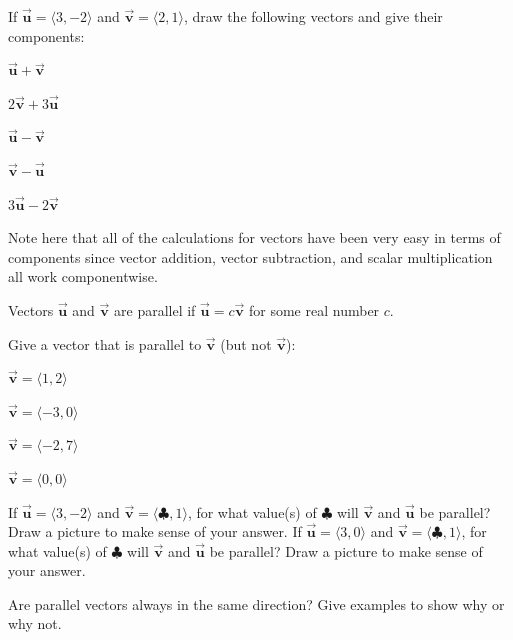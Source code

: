 \bq If $\vec{\textbf{u}}=\langle 3,-2\rangle$ and $\vec{\textbf{v}}=\langle 2,1\rangle$, draw the following vectors and give their components:
\be
\item $\vec{\textbf{u}}+ \vec{\textbf{v}}$
\item $2\vec{\textbf{v}}+3 \vec{\textbf{u}}$
\item $\vec{\textbf{u}}- \vec{\textbf{v}}$
\item $\vec{\textbf{v}}- \vec{\textbf{u}}$
\item $3\vec{\textbf{u}}-2 \vec{\textbf{v}}$
\ee
\eq

\begin{info} Note here that all of the calculations for vectors have been very easy in terms of components since vector addition, vector subtraction, and scalar multiplication all work componentwise.

Vectors $\vec{\textbf{u}}$ and $\vec{\textbf{v}}$ are parallel if $\vec{\textbf{u}}= c \vec{\textbf{v}}$ for some real number $c$. \end{info}

\bq Give a vector that is parallel to $\vec{\textbf{v}}$ (but not $\vec{\textbf{v}}$):
\be
\item $\vec{\textbf{v}}= \langle 1,2 \rangle$
\item $\vec{\textbf{v}}= \langle -3,0 \rangle$
\item $\vec{\textbf{v}}= \langle -2,7 \rangle$
\item $\vec{\textbf{v}}= \langle 0,0 \rangle$
\ee
\eq

\bq If $\vec{\textbf{u}}=\langle 3,-2\rangle$ and $\vec{\textbf{v}}=\langle \clubsuit,1\rangle$, for what value(s) of $\clubsuit$ will $\vec{\textbf{v}}$ and $\vec{\textbf{u}}$ be parallel? Draw a picture to make sense of your answer.
\eq
\bq If $\vec{\textbf{u}}=\langle 3,0\rangle$ and $\vec{\textbf{v}}=\langle \clubsuit,1\rangle$, for what value(s) of $\clubsuit$ will $\vec{\textbf{v}}$ and $\vec{\textbf{u}}$ be parallel? Draw a picture to make sense of your answer.
\eq

\bq Are parallel vectors always in the same direction? Give examples to show why or why not. \eq


